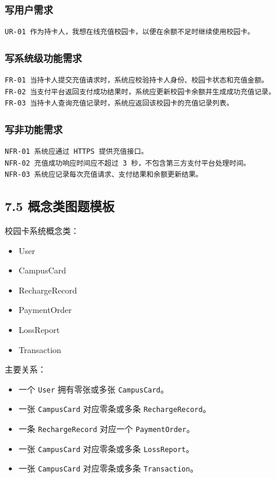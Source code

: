 \documentclass[UTF8,zihao=-4]{ctexart}
\begin{document}
\subsubsection{写用户需求}

\small
\begin{verbatim}
UR-01 作为持卡人，我想在线充值校园卡，以便在余额不足时继续使用校园卡。
\end{verbatim}
\normalsize

\subsubsection{写系统级功能需求}

\small
\begin{verbatim}
FR-01 当持卡人提交充值请求时，系统应校验持卡人身份、校园卡状态和充值金额。
FR-02 当支付平台返回支付成功结果时，系统应更新校园卡余额并生成成功充值记录。
FR-03 当持卡人查询充值记录时，系统应返回该校园卡的充值记录列表。
\end{verbatim}
\normalsize

\subsubsection{写非功能需求}

\small
\begin{verbatim}
NFR-01 系统应通过 HTTPS 提供充值接口。
NFR-02 充值成功响应时间应不超过 3 秒，不包含第三方支付平台处理时间。
NFR-03 系统应记录每次充值请求、支付结果和余额更新结果。
\end{verbatim}
\normalsize

\subsection{7.5 概念类图题模板}

校园卡系统概念类：

\begin{itemize}
\item User
\item CampusCard
\item RechargeRecord
\item PaymentOrder
\item LossReport
\item Transaction
\end{itemize}

主要关系：

\begin{itemize}
\item 一个 \texttt{User} 拥有零张或多张 \texttt{CampusCard}。
\item 一张 \texttt{CampusCard} 对应零条或多条 \texttt{RechargeRecord}。
\item 一条 \texttt{RechargeRecord} 对应一个 \texttt{PaymentOrder}。
\item 一张 \texttt{CampusCard} 对应零条或多条 \texttt{LossReport}。
\item 一张 \texttt{CampusCard} 对应零条或多条 \texttt{Transaction}。
\end{itemize}
\end{document}
